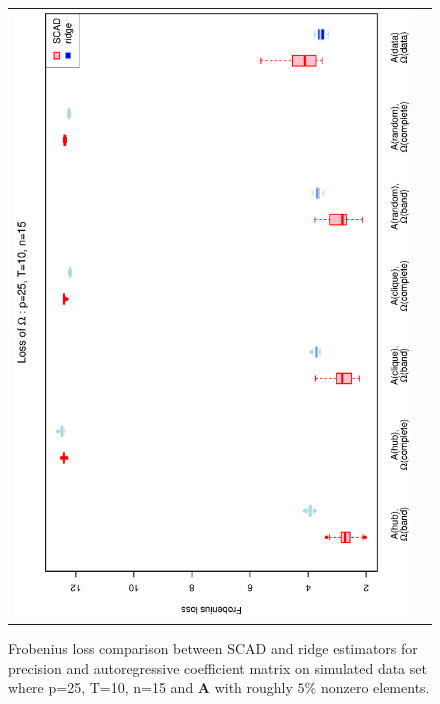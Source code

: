\documentclass[a4paper]{article}
\begin{document}
\begin{figure}[h!]
\begin{tabular}{cc}
\includegraphics[scale=0.45,angle=270]{LossOmega25T10N15_5.eps}
\end{tabular}
\caption{Frobenius loss comparison between SCAD and ridge estimators for precision and autoregressive coefficient matrix on simulated data set where p=25, T=10, n=15  and $\mathbf{A}$ with roughly $5\%$ nonzero elements.}
\label{figSM:Loss25T10N15_5}
\end{figure}

\end{document}
